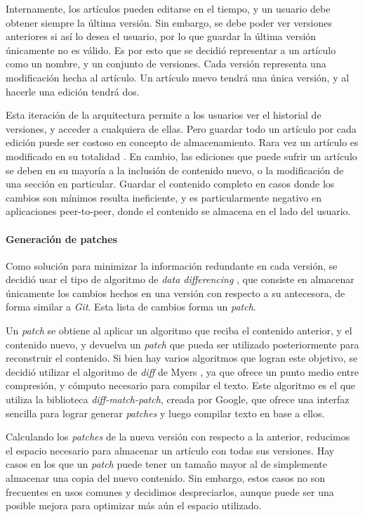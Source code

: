 Internamente, los artículos pueden editarse en el tiempo, y un usuario debe obtener siempre la última versión. Sin embargo, se debe poder ver versiones anteriores si así lo desea el usuario, por lo que guardar la última versión únicamente no es válido. Es por esto que se decidió representar a un artículo como un nombre, y un conjunto de versiones. Cada versión representa una modificación hecha al artículo. Un artículo nuevo tendrá una única versión, y al hacerle una edición tendrá dos.

Esta iteración de la arquitectura permite a los usuarios ver el historial de versiones, y acceder a cualquiera de ellas. Pero guardar todo un artículo por cada edición puede ser costoso en concepto de almacenamiento. Rara vez un artículo es modificado en su totalidad \cite{wiki-edits-stats}. En cambio, las ediciones que puede sufrir un artículo se deben en su mayoría a la inclusión de contenido nuevo, o la modificación de una sección en particular. Guardar el contenido completo en casos donde los cambios son mínimos resulta ineficiente, y es particularmente negativo en aplicaciones peer-to-peer, donde el contenido se almacena en el lado del usuario.

\paragraph{Generación de patches}

Como solución para minimizar la información redundante en cada versión, se decidió usar el tipo de algoritmo de \textit{data differencing} \cite{data-differencing}, que consiste en almacenar únicamente los cambios hechos en una versión con respecto a su antecesora, de forma similar a \textit{Git}. Esta lista de cambios forma un \textit{patch}.

Un \textit{patch} se obtiene al aplicar un algoritmo que reciba el contenido anterior, y el contenido nuevo, y devuelva un \textit{patch} que pueda ser utilizado posteriormente para reconstruir el contenido. Si bien hay varios algoritmos que logran este objetivo, se decidió utilizar el algoritmo de \textit{diff} de Myers \cite{myers-diff}, ya que ofrece un punto medio entre compresión, y cómputo necesario para compilar el texto. Este algoritmo es el que utiliza la biblioteca \textit{diff-match-patch}, creada por Google, que ofrece una interfaz sencilla para lograr generar \textit{patches} y luego compilar texto en base a ellos.

Calculando los \textit{patches} de la nueva versión con respecto a la anterior, reducimos el espacio necesario para almacenar un artículo con todas sus versiones.  Hay casos en los que un \textit{patch} puede tener un tamaño mayor al de simplemente almacenar una copia del nuevo contenido. Sin embargo, estos casos no son frecuentes en usos comunes y decidimos despreciarlos, aunque puede ser una posible mejora para optimizar más aún el espacio utilizado.

